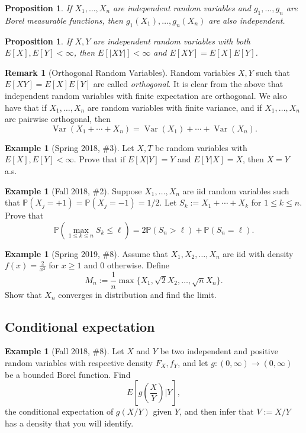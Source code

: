 \documentclass[12pt,reqno]{article}
\renewcommand{\emph}[1]{\textit{#1}}
\theoremstyle{plain}
\newtheorem{prop}[theorem]{Proposition}
\theoremstyle{definition}
\newtheorem{example}[theorem]{Example}
\newtheorem{remark}[theorem]{Remark}
\newcommand{\PP}[1]{\ensuremath{\mathbb{P}\left(#1\right)}}
\begin{document}
\begin{prop}
If $X_1,\ldots,X_n$ are independent random variables and $g_1,\ldots,g_n$ are 
Borel measurable functions, then $g_1(X_1),\ldots,g_n(X_n)$ are also independent. 
\end{prop} 

\begin{prop}
If $X,Y$ are independent random variables with both $E[X],E[Y] < \infty$, then 
$E[|XY|] < \infty$ and $E[XY] = E[X]E[Y]$. 
\end{prop} 

\begin{remark}[Orthogonal Random Variables]
Random variables $X,Y$ such that $E[XY] = E[X]E[Y]$ are called \emph{orthogonal}. 
It is clear from the above that independent random variables with finite expectation 
are orthogonal. We also have that if $X_1,\ldots,X_n$ are random variables with 
finite variance, and if $X_1,\ldots,X_n$ are pairwise orthogonal, then 
\[
\operatorname{Var}(X_1+\cdots+X_n) = \operatorname{Var}(X_1) + \cdots + 
     \operatorname{Var}(X_n). 
\]
\end{remark} 

\begin{example}[Spring 2018, \#3]
Let $X,T$ be random variables with $E[X], E[Y] < \infty$. Prove that if 
$E[X|Y]=Y$ and $E[Y|X] = X$, then $X = Y$ a.s.
\end{example} 

\begin{example}[Fall 2018, \#2]
Suppose $X_1,\ldots,X_n$ are iid random variables such that 
$\PP{X_j = +1} = \PP{X_j = -1} = 1/2$. Let $S_k := X_1+\cdots+X_k$ for 
$1 \leq k \leq n$. Prove that 
\[
\PP{\max_{1 \leq k \leq n} S_k \leq \ell} = 2\PP{S_n > \ell} + 
     \PP{S_n = \ell}. 
\]
\end{example} 

\begin{example}[Spring 2019, \#8]
Assume that $X_1,X_2,\ldots,X_n$ are iid with density $f(x) = \frac{2}{x^3}$ 
for $x \geq 1$ and $0$ otherwise. Define 
\[
M_n := \frac{1}{n} \max\{X_1, \sqrt{2} X_2,\ldots, \sqrt{n} X_n\}.
\]
Show that $X_n$ converges in distribution and find the limit. 
\end{example} 

\subsection{Conditional expectation} 

\begin{example}[Fall 2018, \#8]
Let $X$ and $Y$ be two independent and positive random variables with 
respective density $F_X,f_Y$, and let $g: (0, \infty) \rightarrow (0, \infty)$ 
be a bounded Borel function. Find 
\[
E\left[g\left(\frac{X}{Y}\right) \Bigr\rvert Y\right], 
\]
the conditional expectation of $g(X/Y)$ given $Y$, and then infer that 
$V := X/Y$ has a density that you will identify. 
\end{example} 
\end{document}
